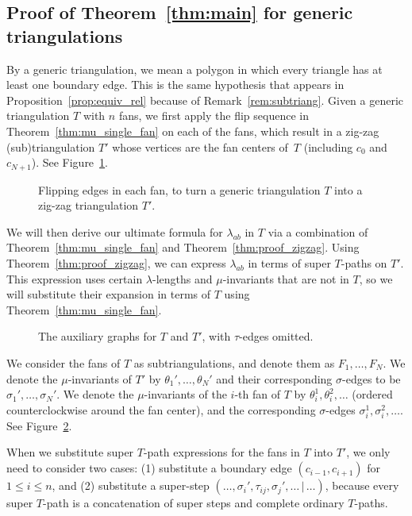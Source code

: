 \documentclass[pdftex]{sigma}
\numberwithin{equation}{section}
\begin{document}
\subsection{Proof of Theorem~\ref{thm:main} for generic triangulations}
By a generic triangulation, we mean a polygon in which every triangle has at least one boundary edge. This is the same hypothesis that appears in Proposition~\ref{prop:equiv_rel} because of Remark~\ref{rem:subtriang}. Given a generic triangulation $T$ with $n$ fans, we first apply the flip sequence in Theorem~\ref{thm:mu_single_fan} on each of the fans,
which result in a zig-zag (sub)triangulation $T'$ whose vertices are the fan centers of~$T$ (including $c_0$ and $c_{N+1}$). See Figure~\ref{fig:main_flip_sequence}.

\begin{figure}[h]
\centering

\caption{Flipping edges in each fan, to turn a generic triangulation $T$ into a zig-zag triangulation $T'$.}\label{fig:main_flip_sequence}
\end{figure}

We will then derive our ultimate formula for $\lambda_{ab}$ in $T$ via a combination of Theorem~\ref{thm:mu_single_fan} and Theorem~\ref{thm:proof_zigzag}.
Using Theorem~\ref{thm:proof_zigzag}, we can express $\lambda_{ab}$ in terms of super $T$-paths on $T'$.
This expression uses certain $\lambda$-lengths and $\mu$-invariants that are not in $T$, so we will substitute their expansion
in terms of $T$ using Theorem~\ref{thm:mu_single_fan}.

\begin{figure}[h]

\caption{The auxiliary graphs for $T$ and $T'$, with $\tau$-edges omitted.}\label{fig:main_flip_sequence_labelled}
\end{figure}

We consider the fans of $T$ as subtriangulations, and denote them as $F_1,\dots,F_N$.
We denote the $\mu$-invariants of $T'$ by $\theta_1',\dots,\theta_N'$ and their corresponding $\sigma$-edges to be $\sigma_1',\dots,\sigma_N'$.
We denote the $\mu$-invariants of the $i$-th fan of $T$ by $\theta_i^1,\theta_i^2,\dots$ (ordered counterclockwise around the fan center),
and the corresponding $\sigma$-edges $\sigma_i^1,\sigma_i^2,\dots$. See Figure~\ref{fig:main_flip_sequence_labelled}.

When we substitute super $T$-path expressions for the fans in $T$ into $T'$, we only need to consider two cases:
(1) substitute a boundary edge $(c_{i-1},c_{i+1})$ for $1\leqslant i\leqslant n$,
and (2) substitute a super-step $(\dots,\sigma_i',\tau_{ij},\sigma_j',\dots\,|\,\dots)$,
because every super $T$-path is a concatenation of super steps and complete ordinary $T$-paths.
\end{document}
